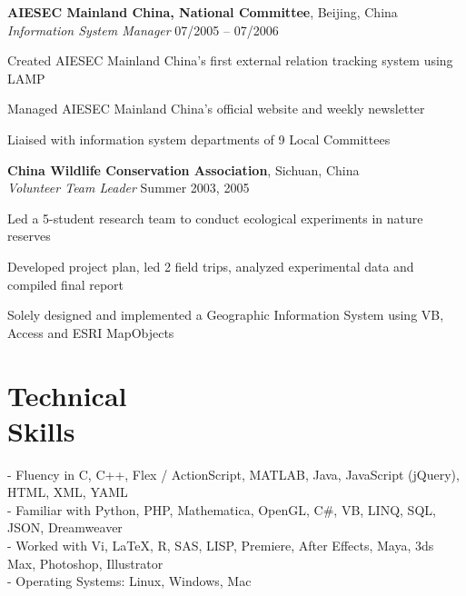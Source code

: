 \documentclass[margin,line]{resume}
\begin{document}
\begin{resume}
    \textbf{AIESEC Mainland China, National Committee}, Beijing, China \\
    \textsl{Information System Manager} \hfill 07/2005 -- 07/2006 \vspace{-3mm}\\\vspace{-1mm}%
      \begin{list2}
      \item Created AIESEC Mainland China's first external relation tracking system using LAMP
      \item Managed AIESEC Mainland China's official website and weekly newsletter 
      \item Liaised with information system departments of 9 Local Committees 
      \end{list2}

    \textbf{China Wildlife Conservation Association}, Sichuan, China \\
    \textsl{Volunteer Team Leader} \hfill Summer 2003, 2005  \vspace{-3mm}\\\vspace{-1mm}%
      \begin{list2}
      \item Led a 5-student research team to conduct ecological experiments in nature reserves 
      \item Developed project plan, led 2 field trips, analyzed experimental data and compiled final report 
      \item Solely designed and implemented a Geographic Information System using VB, Access and ESRI MapObjects 
      \end{list2}

    \section{\mysidestyle Technical \\ Skills} 
      
      - Fluency in C, C++, Flex / ActionScript, MATLAB, Java, JavaScript (jQuery), HTML, XML, YAML \\
      - Familiar with Python, PHP, Mathematica, OpenGL, C\#, VB, LINQ, SQL, JSON, Dreamweaver \\
      - Worked with Vi, \LaTeX, R, SAS, LISP, Premiere, After Effects, Maya, 3ds Max, Photoshop, Illustrator \\
      - Operating Systems: Linux, Windows, Mac       
      


\end{resume}
\end{document}

